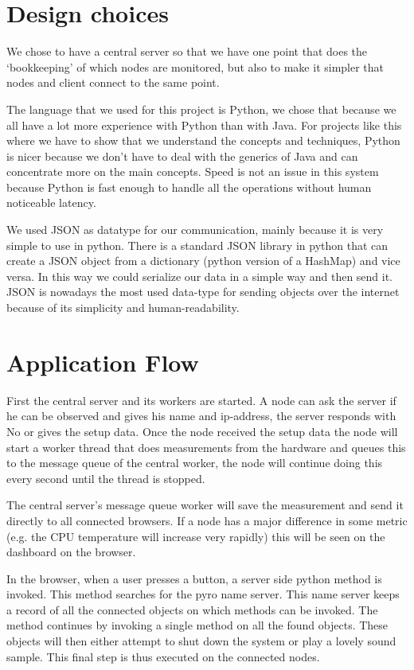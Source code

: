 \documentclass{article}
\begin{document}
\section{Design choices}
	We chose to have a central server so that we have one point that 
	does the `bookkeeping' of which nodes are monitored, but also to 
	make it simpler that nodes and client connect to the same point.
	
	The language that we used for this project is Python, we chose that 
	because we all have a lot more experience with Python than with Java. For 
	projects like this where we have to show that we understand the concepts 
	and techniques, Python is nicer because we don't have to deal with the
	generics of Java and can concentrate more on the main concepts. Speed is 
	not an issue in this system because Python is fast enough to handle all 
	the operations without human noticeable latency.
	
	We used JSON as datatype for our communication, mainly because it is very 
	simple to use in python. There is a standard JSON library in python 
	that can create a JSON object from a dictionary (python version of a 
	HashMap) and vice versa.
	In this way we could serialize our data in a simple way and then send it.
	JSON is nowadays the most used data-type for sending objects over the 
	internet because of its simplicity and human-readability. %
	
\section{Application Flow}
	First the central server and its workers are started. A node can ask the 
	server if he can be observed and gives his name and ip-address, the server 
	responds with No or gives the setup data. Once the node received the setup 
	data the node will start a worker thread that does measurements from the 
	hardware and queues this to the message queue of the central worker, the 
	node will continue doing this every second until the thread is stopped. 

	The central server's message queue worker will save the measurement and 
	send it directly to all connected browsers. If a node has a major difference
	in some metric (e.g. the CPU temperature will increase very rapidly) this 
	will be seen on the dashboard on the browser. 

	In the browser, when a user presses a button, a server side python method is 
	invoked. This method searches for the pyro name server. This name server 
	keeps a record of all the connected objects on which methods can be invoked.
	The method continues by invoking a single method on all the found objects.
	These objects will then either attempt to shut down the system or play a
	lovely sound sample. This final step is thus executed on the connected nodes.
\end{document}
